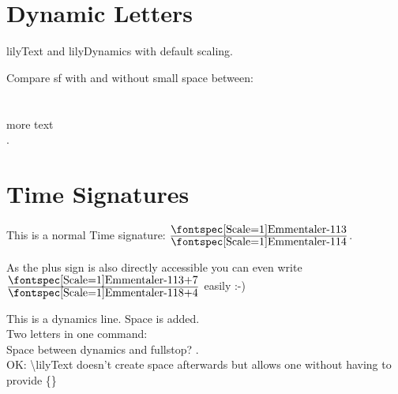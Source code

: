 \documentclass{scrartcl}
\newcommand*{\lilyTimeSignature}[2]{$\frac{\mbox{\lilyText{#1}}}{\mbox{\lilyText{#2}}}$}
\begin{document}
\section*{Dynamic Letters}
{	\LARGE
}	
	
	lilyText  and lilyDynamics  with default scaling.
	
	Compare sf with and without small space between:\\
	\\
	\\
	\lilyRF* more text\\
	\lilyRFZ.
	
\section*{Time Signatures}
	This is a normal Time signature: \lilyTimeSignature{3}{4}.
	
	As the plus sign is also directly accessible you can even
	write \lilyTimeSignature{3+7}{8+4} easily :-)

	This is a dynamics  line. Space is added.\\
	Two letters in one command: \\
	Space between dynamics and fullstop? .\\
	OK: \textbackslash lilyText doesn't create space afterwards but allows one without having to provide \{\}
	
\end{document}
